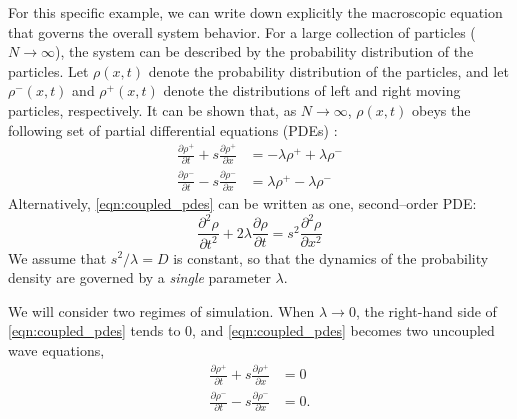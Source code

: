 \documentclass[prl, reprint, final, showkeys]{revtex4-1}
\begin{document}

For this specific example, we can write down explicitly the macroscopic equation that governs the overall system behavior.
%
For a large collection of particles ($N \rightarrow \infty$), the system can be described by the probability distribution of the particles.
%
Let $\rho(x, t)$ denote the probability distribution of the particles, and let $\rho^-(x, t)$ and $\rho^+(x, t)$ denote the distributions of left and right moving particles, respectively.
%
It can be shown that, as $N \rightarrow \infty$, $\rho(x, t)$ obeys the following set of partial differential equations (PDEs) \cite{othmer2000diffusion}:
\begin{equation} \label{eqn:coupled_pdes}
\begin{aligned}
\frac{\partial \rho^+}{\partial t} + s \frac{\partial \rho^+}{\partial x} & = -\lambda \rho^+ +\lambda \rho^- \\
\frac{\partial \rho^-}{\partial t} - s \frac{\partial \rho^-}{\partial x} & = \lambda \rho^+ -\lambda \rho^- 
\end{aligned}
\end{equation}
%
Alternatively, \eqref{eqn:coupled_pdes} can be written as one, second--order PDE:
\begin{equation} \label{eq:second_order_pde}
\frac{\partial^2 \rho}{\partial t^2} + 2 \lambda \frac{\partial \rho}{\partial t} = s^2 \frac{\partial ^2 \rho}{\partial x^2}
\end{equation}
%
We assume that $s^2/\lambda = D$ is constant, so that the dynamics of the probability density are governed by a {\em single} parameter $\lambda$.


We will consider two regimes of simulation.
%
When $\lambda \rightarrow 0$, the right-hand side of \eqref{eqn:coupled_pdes} tends to 0, and \eqref{eqn:coupled_pdes} becomes two uncoupled wave equations,
\begin{equation}
\begin{aligned}
\frac{\partial \rho^+}{\partial t} + s \frac{\partial \rho^+}{\partial x} & = 0 \\
\frac{\partial \rho^-}{\partial t} - s \frac{\partial \rho^-}{\partial x} & = 0.
\end{aligned}
\end{equation}
\end{document}
